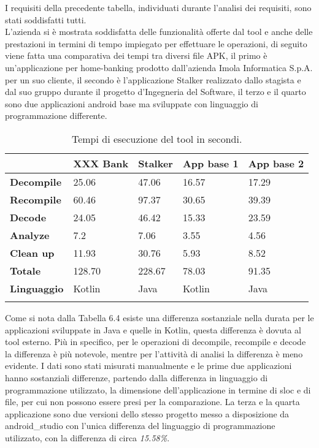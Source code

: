 I requisiti della precedente tabella, individuati durante l'analisi dei requisiti, sono stati soddisfatti tutti.\\
L'azienda si è mostrata soddisfatta delle funzionalità offerte dal tool e anche delle prestazioni in termini di tempo impiegato per effettuare le operazioni, di seguito viene fatta una comparativa dei tempi tra diversi file APK, il primo è un'applicazione per home-banking prodotto dall'azienda Imola Informatica S.p.A. per un suo cliente, il secondo è l'applicazione Stalker realizzato dallo stagista e dal suo gruppo durante il progetto d'Ingegneria del Software, il terzo e il quarto sono due applicazioni android base ma sviluppate con linguaggio di programmazione differente.
\begin{longtable}{| C{2cm}| C{2cm}| C{2.5cm}| C{2.5cm}| C{2.5cm}|}
    \hline
                       & \textbf{XXX Bank} & \textbf{Stalker} & \textbf{App base 1} & \textbf{App base 2} \\\hline
    \textbf{Decompile}  & 25.06             & 47.06            & 16.57               & 17.29               \\\hline
    \textbf{Recompile}  & 60.46             & 97.37            & 30.65               & 39.39               \\\hline
    \textbf{Decode}     & 24.05             & 46.42            & 15.33               & 23.59               \\\hline
    \textbf{Analyze}    & 7.2               & 7.06             & 3.55                & 4.56               \\\hline
    \textbf{Clean up}   & 11.93             & 30.76            & 5.93                & 8.52                \\\hline
    \textbf{Totale}     & 128.70            & 228.67           & 78.03               & 91.35               \\\hline
    \textbf{Linguaggio} & Kotlin            & Java             & Kotlin              & Java                \\\hline
    \caption{Tempi di esecuzione del tool in secondi.}
\end{longtable}
Come si nota dalla Tabella 6.4 esiste una differenza sostanziale nella durata per le applicazioni sviluppate in Java e quelle in Kotlin, questa differenza è dovuta al tool esterno.
Più in specifico, per le operazioni di decompile, recompile e decode la differenza è più notevole, mentre per l'attività di analisi la differenza è meno evidente.
I dati sono stati misurati manualmente e le prime due applicazioni hanno sostanziali differenze, partendo dalla differenza in linguaggio di programmazione utilizzato, la dimensione dell'applicazione in termine di \gls{sloc} e di file, per cui non possono essere presi per la comparazione.
La terza e la quarta applicazione sono due versioni dello stesso progetto messo a disposizione da \gls{android_studio} con l'unica differenza del linguaggio di programmazione utilizzato, con la differenza di circa \textit{15.58\%}.
